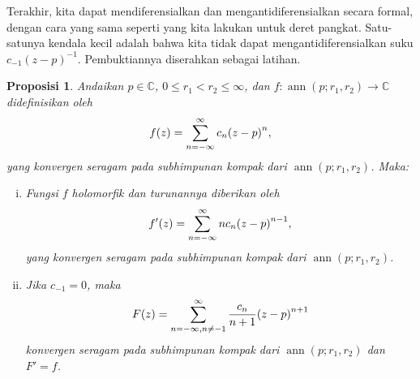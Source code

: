 \documentclass[12pt,openany]{book}
\newcommand{\avoidbreak}{\postdisplaypenalty=100}
\newcommand{\ann}{\operatorname{ann}}
\newcommand{\C}{{\mathbb{C}}}
\theoremstyle{plain}
\newtheorem{prop}[thm]{Proposisi}
\theoremstyle{remark}
\theoremstyle{definition}
\theoremstyle{exercise}
\theoremstyle{example}
\begin{document}
Terakhir, kita dapat mendiferensialkan dan mengantidiferensialkan
secara formal, dengan cara yang sama seperti yang kita lakukan untuk deret pangkat. Satu-satunya kendala kecil
adalah bahwa kita tidak dapat mengantidiferensialkan suku $c_{-1}{(z-p)}^{-1}$.
Pembuktiannya diserahkan sebagai latihan.

\begin{prop} \label{prop:diffantidifflaurent}
Andaikan $p \in \C$, $0 \leq r_1 < r_2 \leq \infty$, dan
$f \colon \ann(p;r_1,r_2) \to \C$ didefinisikan oleh
\begin{equation*}
f(z) = \sum_{n=-\infty}^\infty c_n {(z-p)}^n ,
\avoidbreak
\end{equation*}
yang konvergen seragam pada subhimpunan kompak dari $\ann(p;r_1,r_2)$. Maka:
\begin{enumerate}[(i)]
\item
Fungsi
$f$ holomorfik dan turunannya diberikan oleh
\begin{equation*}
f'(z) = \sum_{n=-\infty}^\infty n c_n {(z-p)}^{n-1} ,
\avoidbreak
\end{equation*}
yang konvergen seragam pada subhimpunan kompak dari $\ann(p;r_1,r_2)$.
\item
Jika $c_{-1} = 0$, maka
\begin{equation*}
F(z) = \sum_{n=-\infty,n \neq -1}^\infty \frac{c_n}{n+1} {(z-p)}^{n+1}
\avoidbreak
\end{equation*}
konvergen seragam pada subhimpunan kompak dari
$\ann(p;r_1,r_2)$ dan $F' = f$.
\end{enumerate}
\end{prop}
\end{document}
